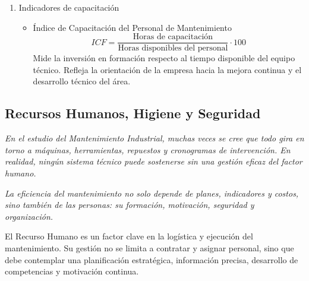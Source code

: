 \documentclass[a4paper,oneside,11pt]{article}
\begin{document}
\begin{enumerate}
    \item Indicadores de capacitación
    \begin{itemize}
        \item Índice de Capacitación del Personal de Mantenimiento
        \begin{equation*}
            ICF=\dfrac{\text{Horas de capacitación}}{\text{Horas disponibles del personal}} \cdot 100
        \end{equation*}
        Mide la inversión en formación respecto al tiempo disponible del equipo técnico. Refleja la orientación de la empresa hacia la mejora continua y el desarrollo técnico del área.
    \end{itemize}
    
\end{enumerate}

\subsection{Recursos Humanos, Higiene y Seguridad}

\textit{En el estudio del Mantenimiento Industrial, muchas veces se cree que todo gira en torno a máquinas, herramientas, repuestos y cronogramas de intervención. En realidad, ningún sistema técnico puede sostenerse sin una gestión eficaz del factor humano.}

\textit{La eficiencia del mantenimiento no solo depende de planes, indicadores y costos, sino también de las personas: su formación, motivación, seguridad y organización.}

El Recurso Humano es un factor clave en la logística y ejecución del mantenimiento. Su gestión no se limita a contratar y asignar personal, sino que debe contemplar una planificación estratégica, información precisa, desarrollo de competencias y motivación continua.
\end{document}
